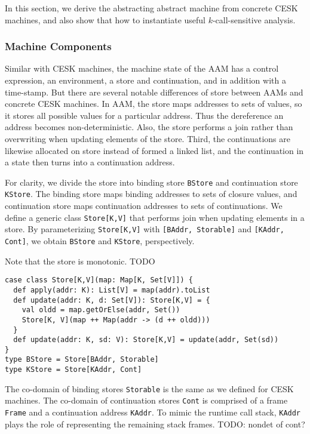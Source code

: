 \documentclass[acmsmall,review,anonymous]{acmart}\settopmatter{printfolios=true,printccs=false,printacmref=false}
\begin{document}
In this section, we derive the abstracting abstract machine from concrete
CESK machines, and also show that how to instantiate
useful $k$-call-sensitive analysis.

\subsubsection{Machine Components}

Similar with CESK machines, the machine state of the AAM has a control expression,
an environment, a store and continuation, and in addition with a time-stamp.
But there are several notable differences of store between AAMs and concrete CESK machines.
In AAM, the store maps addresses to sets of values, so it stores all possible values
for a particular address. Thus the dereference an address becomes non-deterministic.
Also, the store performs a join rather than overwriting when updating elements of the store.
Third, the continuations are likewise allocated on store instead of formed a linked list,
and the continuation in a state then turns into a continuation address.

For clarity, we divide the store into binding store \texttt{BStore} and continuation store \texttt{KStore}. 
The binding store maps binding addresses to sets of closure values, and continuation store maps
continuation addresses to sets of continuations.
We define a generic class \texttt{Store[K,V]} that performs join when updating elements
in a store. By parameterizing \texttt{Store[K,V]} with \texttt{[BAddr, Storable]} and 
\texttt{[KAddr, Cont]}, we obtain \texttt{BStore} and \texttt{KStore}, perspectively.

Note that the store is monotonic. TODO

\begin{verbatim}
case class Store[K,V](map: Map[K, Set[V]]) {
  def apply(addr: K): List[V] = map(addr).toList
  def update(addr: K, d: Set[V]): Store[K,V] = {
    val oldd = map.getOrElse(addr, Set())
    Store[K, V](map ++ Map(addr -> (d ++ oldd)))
  }
  def update(addr: K, sd: V): Store[K,V] = update(addr, Set(sd))
}
type BStore = Store[BAddr, Storable]
type KStore = Store[KAddr, Cont]
\end{verbatim}

The co-domain of binding stores \texttt{Storable} is the same
as we defined for CESK machines.
The co-domain of continuation stores \texttt{Cont} is comprised of 
a frame \texttt{Frame} and a continuation address \texttt{KAddr}.
To mimic the runtime call stack, \texttt{KAddr} plays the role of
representing the remaining stack frames.
TODO: nondet of cont?
\end{document}

